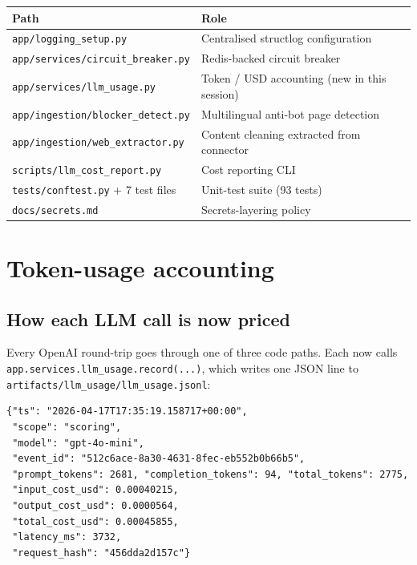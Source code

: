 \documentclass[11pt,a4paper]{article}
\begin{document}
\begin{center}
\footnotesize
\begin{tabularx}{\linewidth}{@{}l X@{}}
\toprule
\textbf{Path} & \textbf{Role} \\
\midrule
\texttt{app/logging\_setup.py}       & Centralised structlog configuration \\
\texttt{app/services/circuit\_breaker.py} & Redis-backed circuit breaker \\
\texttt{app/services/llm\_usage.py}  & Token / USD accounting (new in this session) \\
\texttt{app/ingestion/blocker\_detect.py} & Multilingual anti-bot page detection \\
\texttt{app/ingestion/web\_extractor.py}  & Content cleaning extracted from connector \\
\texttt{scripts/llm\_cost\_report.py}     & Cost reporting CLI \\
\texttt{tests/conftest.py} + 7 test files  & Unit-test suite (93 tests) \\
\texttt{docs/secrets.md}              & Secrets-layering policy \\
\bottomrule
\end{tabularx}
\end{center}

\section{Token-usage accounting}

\subsection{How each LLM call is now priced}

Every OpenAI round-trip goes through one of three code paths. Each now
calls \texttt{app.services.llm\_usage.record(...)}, which writes one JSON
line to \texttt{artifacts/llm\_usage/llm\_usage.jsonl}:

\begin{lstlisting}[style=output]
{"ts": "2026-04-17T17:35:19.158717+00:00",
 "scope": "scoring",
 "model": "gpt-4o-mini",
 "event_id": "512c6ace-8a30-4631-8fec-eb552b0b66b5",
 "prompt_tokens": 2681, "completion_tokens": 94, "total_tokens": 2775,
 "input_cost_usd": 0.00040215,
 "output_cost_usd": 0.0000564,
 "total_cost_usd": 0.00045855,
 "latency_ms": 3732,
 "request_hash": "456dda2d157c"}
\end{lstlisting}
\end{document}
